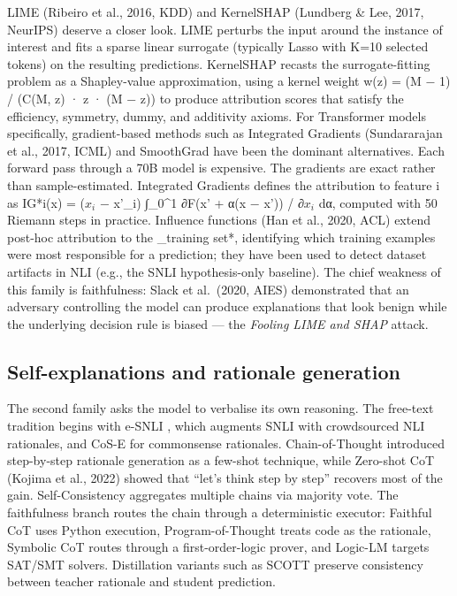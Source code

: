 \documentclass{article}
\begin{document}
LIME (Ribeiro et al., 2016, KDD) and KernelSHAP (Lundberg \& Lee, 2017, NeurIPS) deserve a closer look. LIME perturbs the input around the instance of interest and fits a sparse linear surrogate (typically Lasso with K=10 selected tokens) on the resulting predictions. KernelSHAP recasts the surrogate-fitting problem as a Shapley-value approximation, using a kernel weight w(z) = (M − 1) / (C(M, \textbar z\textbar) · \textbar z\textbar{} · (M − \textbar z\textbar)) to produce attribution scores that satisfy the efficiency, symmetry, dummy, and additivity axioms. For Transformer models specifically, gradient-based methods such as Integrated Gradients (Sundararajan et al., 2017, ICML) and SmoothGrad have been the dominant alternatives. Each forward pass through a 70B model is expensive. The gradients are exact rather than sample-estimated. Integrated Gradients defines the attribution to feature i as IG*i(x) = (\(x_i\) − x'\_i) ∫\_0\^{}1 ∂F(x' + α(x − x')) / ∂\(x_i\) dα, computed with 50 Riemann steps in practice. Influence functions (Han et al., 2020, ACL) extend post-hoc attribution to the \_training set*, identifying which training examples were most responsible for a prediction; they have been used to detect dataset artifacts in NLI (e.g., the SNLI hypothesis-only baseline). The chief weakness of this family is faithfulness: Slack et al.~(2020, AIES) demonstrated that an adversary controlling the model can produce explanations that look benign while the underlying decision rule is biased --- the \emph{Fooling LIME and SHAP} attack.

\subsection{Self-explanations and rationale generation}\label{self-explanations-and-rationale-generation}

The second family asks the model to verbalise its own reasoning. The free-text tradition begins with e-SNLI \citep{camburu2018esnlinaturallangua}, which augments SNLI with crowdsourced NLI rationales, and CoS-E \citep{rajani2019explainyourselflev} for commonsense rationales. Chain-of-Thought \citep{wei2022chainofthoughtprom} introduced step-by-step rationale generation as a few-shot technique, while Zero-shot CoT (Kojima et al., 2022) showed that ``let's think step by step'' recovers most of the gain. Self-Consistency \citep{wang2023scottselfconsisten} aggregates multiple chains via majority vote. The faithfulness branch routes the chain through a deterministic executor: Faithful CoT \citep{lyu2023faithfulchainoftho} uses Python execution, Program-of-Thought \citep{chen2024diahaluadialoguele} treats code as the rationale, Symbolic CoT \citep{xu2024faithfullogicalrea} routes through a first-order-logic prover, and Logic-LM \citep{pan2023logiclmempoweringl} targets SAT/SMT solvers. Distillation variants such as SCOTT \citep{wang2023scottselfconsisten} preserve consistency between teacher rationale and student prediction.
\end{document}
